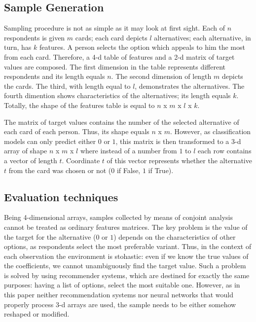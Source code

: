 \documentclass[a4paper, 12pt]{extreport}
\begin{document}
\subsection{Sample Generation}

Sampling procedure is not as simple as it may look at first sight. Each of $n$ respondents is given $m$ cards; each card depicts $l$ alternatives; each alternative, in turn, has $k$ features. A person selects
the option which appeals to him the most from each card. Therefore, a 4-d table of features and a 2-d matrix of target values are composed. The first dimension in the table represents different respondents and its length
equals $n$. The second dimension of length $m$ depicts the cards. The third, with length equal to $l$, demonstrates the alternatives. The fourth dimention shows characteristics of the alternatives; its length equals $k$.
Totally, the shape of the features table is equal to $n$ x $m$ x $l$ x $k$.

The matrix of target values contains the number of the selected alternative of each card of each person. Thus, its shape equals $n$ x $m$.
However, as classification models can only predict either $0$ or $1$, this matrix is then transformed to a 3-d array of shape $n$ x $m$ x $l$ where instead of a number from $1$ to $l$ each row contains a vector of
length $t$. Coordinate $t$ of this vector represents whether the alternative $t$ from the card was chosen or not ($0$ if False, $1$ if True).

\subsection{Evaluation techniques}

Being 4-dimensional arrays, samples collected by means of conjoint analysis cannot be treated as ordinary features matrices. The key problem is the value of the target for the alternative ($0$ or $1$) depends on the
characteristics of other options, as respondents select the most preferable variant. Thus, in the context of each observation the environment is stohastic: even if we know the true values of the coefficients, we cannot
unambiguously find the target value. Such a problem is solved by using recommender systems, which are destined for exactly the same purposes: having a list of options, select the most suitable one. However, as in
this paper neither recommendation systems nor neural networks that would properly process 3-d arrays are used, the sample needs to be either somehow reshaped or modified.
\end{document}
